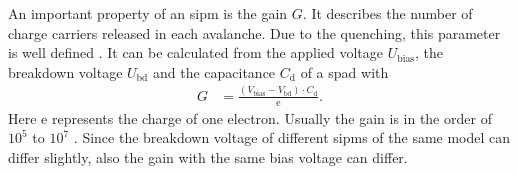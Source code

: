 



An important property of an \ac{sipm} is the gain $G$.
It describes the number of charge carriers released in each avalanche.
Due to the quenching, this parameter is well defined \cite{}.
It can be calculated from the applied voltage $U_\text{bias}$, the breakdown voltage $U_\text{bd}$ and the capacitance $C_\text{d}$ of a \ac{spad} with
\begin{align}
	G &= \frac{(V_\text{bias}- V_\text{bd})\cdot C_\text{d}}{\text{e}}.
\end{align}
Here e represents the charge of one electron.
Usually the gain is in the order of $10^5$ to $10^7$ \cite{nucl}.
Since the breakdown voltage of different \acp{sipm} of the same model can differ slightly, also the gain with the same bias voltage can differ.


